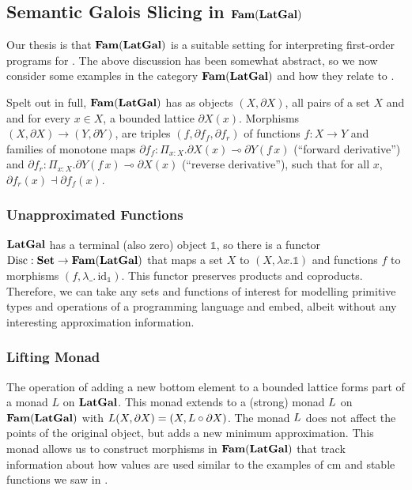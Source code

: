 
\subsection{Semantic Galois Slicing in $\mathbf{Fam}(\mathbf{LatGal})$}
\label{sec:semantic-gps}

Our thesis is that $\mathbf{Fam}(\mathbf{LatGal})$ is a suitable setting for
interpreting first-order programs for \GPS. The above discussion has
been somewhat abstract, so we now consider some examples in the
category $\mathbf{Fam}(\mathbf{LatGal})$ and how they relate to \GPS.

Spelt out in full, $\mathbf{Fam}(\mathbf{LatGal})$ has as objects $(X, \partial X)$,
all pairs of a set $X$ and and for every $x \in X$, a bounded lattice
$\partial X(x)$. Morphisms $(X, \partial X) \to (Y, \partial Y)$, are
triples $(f, \partial f_f, \partial f_r)$ of functions $f : X \to Y$
and families of monotone maps
$\partial f_f : \Pi_{x : X}.\partial X(x) \multimap \partial Y(f\,x)$
(``forward derivative'') and
$\partial f_r : \Pi_{x : X}. \partial Y(f\,x) \multimap \partial X(x)$
(``reverse derivative''), such that for all $x$,
$\partial f_r(x) \dashv \partial f_f(x)$.

\subsubsection{Unapproximated Functions}

$\mathbf{LatGal}$ has a terminal (also zero) object $\mathbb{1}$, so there is
a functor $\mathrm{Disc} : \mathbf{Set} \to \mathbf{Fam}(\mathbf{LatGal})$ that maps a set $X$ to
$(X, \lambda x. \mathbb{1})$ and functions $f$ to morphisms
$(f, \lambda\_.\,\mathrm{id}_{\mathbb{1}})$. This functor preserves
products and coproducts. Therefore, we can take any sets and functions
of interest for modelling primitive types and operations of a
programming language and embed, albeit without any interesting
approximation information.

\subsubsection{Lifting Monad}
\label{sec:models-of-total-gps:lifting}

The operation of adding a new bottom element to a bounded lattice
forms part of a monad $L$ on $\mathbf{LatGal}$. This monad extends to a
(strong) monad $L$ on $\mathbf{Fam}(\mathbf{LatGal})$ with
$L(X, \partial X) = (X, L \circ \partial X)$. The monad $L$
does not affect the points of the original object, but adds a new
minimum approximation. This monad allows us to construct morphisms in
$\mathbf{Fam}(\mathbf{LatGal})$ that track information about how values are used
similar to the examples of cm and stable functions we saw in
.

